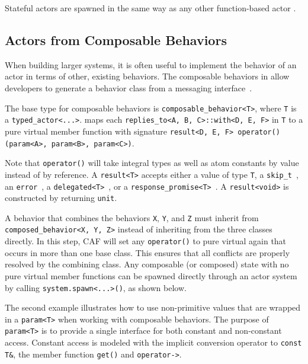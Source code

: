

Stateful actors are spawned in the same way as any other function-based actor .



\clearpage
\subsection{Actors from Composable Behaviors}
\label{composable-behavior}

When building larger systems, it is often useful to implement the behavior of an actor in terms of other, existing behaviors. The composable behaviors in \lib allow developers to generate a behavior class from a messaging interface~.

The base type for composable behaviors is \lstinline^composable_behavior<T>^, where \lstinline^T^ is a \lstinline^typed_actor<...>^. \lib maps each \lstinline^replies_to<A, B, C>::with<D, E, F>^ in \lstinline^T^ to a pure virtual member function with signature \lstinline^result<D, E, F> operator()(param<A>, param<B>, param<C>)^.

Note that \lstinline^operator()^ will take integral types as well as atom constants by value instead of by reference. A \lstinline^result<T>^ accepts either a value of type \lstinline^T^, a \lstinline^skip_t^~, an \lstinline^error^~, a \lstinline^delegated<T>^~, or a \lstinline^response_promise<T>^~. A \lstinline^result<void>^ is constructed by returning \lstinline^unit^.

A behavior that combines the behaviors \lstinline^X^, \lstinline^Y^, and \lstinline^Z^ must inherit from \lstinline^composed_behavior<X, Y, Z>^ instead of inheriting from the three classes directly. In this step, CAF will set any \lstinline^operator()^ to pure virtual again that occurs in more than one base class. This ensures that all conflicts are properly resolved by the combining class. Any composable (or composed) state with no pure virtual member functions can be spawned directly through an actor system by calling \lstinline^system.spawn<...>()^, as shown below.



\clearpage
The second example illustrates how to use non-primitive values that are wrapped in a \lstinline^param<T>^ when working with composable behaviors. The purpose of \lstinline^param<T>^ is to provide a single interface for both constant and non-constant access. Constant access is modeled with the implicit conversion operator to \lstinline^const T&^, the member function \lstinline^get()^ and \lstinline^operator->^. 


